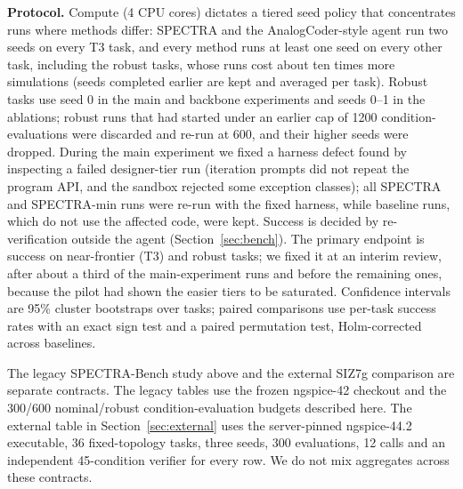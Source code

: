 \textbf{Protocol.} Compute (4 CPU cores) dictates a tiered seed policy that concentrates runs where methods differ:
SPECTRA and the AnalogCoder-style agent run two seeds on every T3 task, and every method runs at least one seed on
every other task, including the robust tasks, whose runs cost about ten times more simulations (seeds completed
earlier are kept and averaged per task). Robust tasks use seed 0 in the main and backbone experiments and seeds 0--1 in
the ablations; robust runs that had started under an earlier cap of 1200 condition-evaluations were discarded and
re-run at 600, and their higher seeds were dropped. During the main experiment we fixed a harness defect found by
inspecting a failed designer-tier run (iteration prompts did not repeat the program API, and the sandbox rejected some
exception classes); all SPECTRA and SPECTRA-min runs were re-run with the fixed harness, while baseline runs, which do
not use the affected code, were kept. Success is decided by re-verification outside the agent (Section~\ref{sec:bench}).
The primary endpoint is success on near-frontier (T3) and robust tasks; we fixed it at an interim review, after
about a third of the main-experiment runs and before the remaining ones, because the pilot had shown the easier tiers to be
saturated. Confidence intervals are 95\%
cluster bootstraps over tasks; paired comparisons use per-task success rates with an exact sign test and a paired
permutation test, Holm-corrected across baselines.

The legacy SPECTRA-Bench study above and the external SIZ7g comparison are separate contracts. The legacy tables
use the frozen ngspice-42 checkout and the 300/600 nominal/robust condition-evaluation budgets described here. The
external table in Section~\ref{sec:external} uses the server-pinned ngspice-44.2 executable, 36 fixed-topology
tasks, three seeds, 300 evaluations, 12 calls and an independent 45-condition verifier for every row. We do not
mix aggregates across these contracts.
